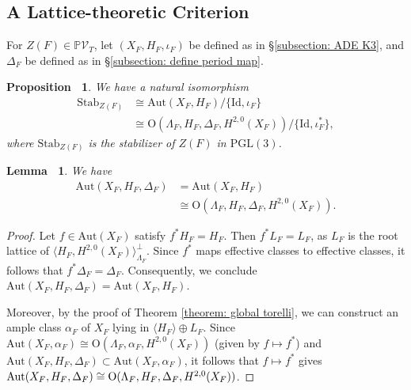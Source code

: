 \documentclass[12pt,reqno,a4paper]{amsart}
\newtheorem{lem}[thm]{Lemma~}
\newtheorem{prop}[thm]{Proposition~}
\theoremstyle{remark}
\theoremstyle{definition}
\begin{document}
\subsection{A Lattice-theoretic Criterion}
For $Z(F)\in \mathbb{P}\mathcal{V}_T$, let $(X_F,H_F,\iota_F)$ be defined as in \S \ref{subsection: ADE K3}, and $\Delta_F$ be defined as in \S \ref{subsection: define period map}.

    



\begin{prop}
\label{prop: describe Stab_Z(F)}
    We have a natural isomorphism
    \begin{align*}
        \mathrm{Stab}_{Z(F)} &\cong \mathrm{Aut}(X_F,H_F)/\{\mathrm{Id},\iota_F\} \\
        &\cong \mathrm{O}(\Lambda_F,H_F,\Delta_F,H^{2,0}(X_F))/\{\mathrm{Id},\iota_F^*\},
    \end{align*}
    where $\mathrm{Stab}_{Z(F)}$ is the stabilizer of $Z(F)$ in $\mathrm{PGL}(3)$. 
\end{prop}

\begin{lem}
\label{lem: describe Aut(X_F,H_F,Delta_F)}
    We have
    \begin{align*}
        \mathrm{Aut}(X_F,H_F,\Delta_F) &= \mathrm{Aut}(X_F,H_F) \\
                &\cong \mathrm{O}(\Lambda_F,H_F,\Delta_F,H^{2,0}(X_F)).
    \end{align*}
    \end{lem}
\begin{proof}
    Let $f\in \mathrm{Aut}(X_F)$ satisfy $f^*H_F=H_F$. Then $f^*L_F=L_F$, as $L_F$ is the root lattice of $\langle H_F,H^{2,0}(X_F)\rangle^\perp_{\Lambda_F}$.
    Since $f^*$ maps effective classes to effective classes, it follows that $f^*\Delta_F=\Delta_F$.
    Consequently, we conclude $\mathrm{Aut}(X_F,H_F,\Delta_F) = \mathrm{Aut}(X_F,H_F)$.

    Moreover, by the proof of Theorem \ref{theorem: global torelli}, we can construct an ample class $\alpha_F$ of $X_F$ lying in $\langle H_F\rangle\oplus L_F$.
    Since $\mathrm{Aut}(X_F,\alpha_F)\cong\mathrm{O}(\Lambda_F,\alpha_F,H^{2,0}(X_F))$ (given by $f\mapsto f^*$) and $\mathrm{Aut}(X_F,H_F,\Delta_F) \subset \mathrm{Aut}(X_F,\alpha_F)$, it follows that $f\mapsto f^*$ gives $\mathrm{Aut}(X_F,H_F,\Delta_F) \cong \\ \mathrm{O}(\Lambda_F,H_F,\Delta_F,H^{2,0}(X_F))$.
\end{proof}
\end{document}

